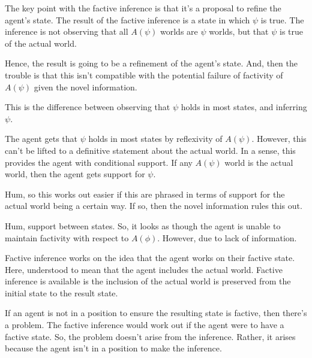 \documentclass[10pt]{article}
\begin{document}
\begin{note}
  The key point with the factive inference is that it's a proposal to refine the agent's state.
  The result of the factive inference is a state in which \(\psi\) is true.
  The inference is not observing that all \(A(\psi)\) worlds are \(\psi\) worlds, but that \(\psi\) is true of the actual world.

  Hence, the result is going to be a refinement of the agent's state.
  And, then the trouble is that this isn't compatible with the potential failure of factivity of \(A(\psi)\) given the novel information.

  This is the difference between observing that \(\psi\) holds in most states, and inferring \(\psi\).

  The agent gets that \(\psi\) holds in most states by reflexivity of \(A(\psi)\).
  However, this can't be lifted to a definitive statement about the actual world.
  In a sense, this provides the agent with conditional support.
  If any \(A(\psi)\) world is the actual world, then the agent gets support for \(\psi\).

  Hum, so this works out easier if this are phrased in terms of support for the actual world being a certain way.
  If so, then the novel information rules this out.

  Hum, support between states.
  So, it looks as though the agent is unable to maintain factivity with respect to \(A(\phi)\).
  However, due to lack of information.
\end{note}

\begin{note}
  Factive inference works on the idea that the agent works on their factive state.
  Here, understood to mean that the agent includes the actual world.
  Factive inference is available is the inclusion of the actual world is preserved from the initial state to the result state.

  If an agent is not in a position to ensure the resulting state is factive, then there's a problem.
  The factive inference would work out if the agent were to have a factive state.
  So, the problem doesn't arise from the inference.
  Rather, it arises because the agent isn't in a position to make the inference.
\end{note}
\end{document}
